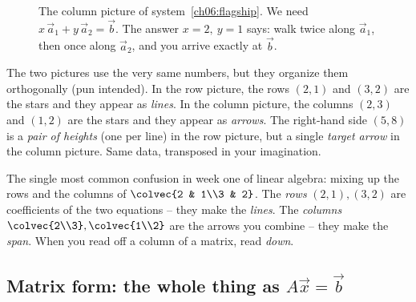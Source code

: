 \begin{figure}[H]
\centering
{}
\caption{The column picture of system~\eqref{ch06:flagship}. We need
$x\,\vec a_1 + y\,\vec a_2 = \vec b$. The answer $x=2,\ y=1$ says: walk twice
along $\vec a_1$, then once along $\vec a_2$, and you arrive exactly at
$\vec b$.}
\label{ch06:colpic}
\end{figure}

The two pictures use the very same numbers, but they organize them
orthogonally (pun intended). In the row picture, the rows $(2,1)$ and
$(3,2)$ are the stars and they appear as \emph{lines}. In the column
picture, the columns $(2,3)$ and $(1,2)$ are the stars and they appear as
\emph{arrows}. The right-hand side $(5,8)$ is a \emph{pair of heights} (one
per line) in the row picture, but a single \emph{target arrow} in the column
picture. Same data, transposed in your imagination.

\begin{trapbox}
The single most common confusion in week one of linear algebra: mixing up
the rows and the columns of $\colvec{2 & 1\\3 & 2}$. The \emph{rows}
$(2,1),(3,2)$ are coefficients of the two equations -- they make the
\emph{lines}. The \emph{columns} $\colvec{2\\3},\colvec{1\\2}$ are the
arrows you combine -- they make the \emph{span}. When you read off a column
of a matrix, read \emph{down}.
\end{trapbox}

\subsection{Matrix form: the whole thing as $A\vec x = \vec b$}

